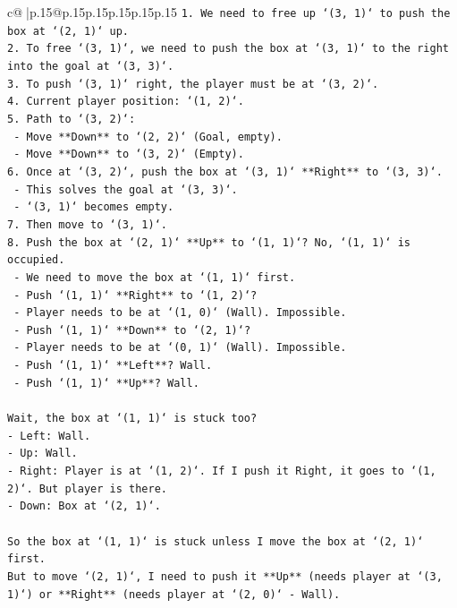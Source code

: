 \documentclass{article}
\begin{document}
{\begin{supertabular}{c@{$\;$}|p{.15\linewidth}@{}p{.15\linewidth}p{.15\linewidth}p{.15\linewidth}p{.15\linewidth}p{.15\linewidth}}
{{{\texttt{1. We need to free up `(3, 1)` to push the box at `(2, 1)` up.} \\
\texttt{2. To free `(3, 1)`, we need to push the box at `(3, 1)` to the right into the goal at `(3, 3)`.} \\
\texttt{3. To push `(3, 1)` right, the player must be at `(3, 2)`.} \\
\texttt{4. Current player position: `(1, 2)`.} \\
\texttt{5. Path to `(3, 2)`:} \\
\texttt{   {-} Move **Down** to `(2, 2)` (Goal, empty).} \\
\texttt{   {-} Move **Down** to `(3, 2)` (Empty).} \\
\texttt{6. Once at `(3, 2)`, push the box at `(3, 1)` **Right** to `(3, 3)`.} \\
\texttt{   {-} This solves the goal at `(3, 3)`.} \\
\texttt{   {-} `(3, 1)` becomes empty.} \\
\texttt{7. Then move to `(3, 1)`.} \\
\texttt{8. Push the box at `(2, 1)` **Up** to `(1, 1)`? No, `(1, 1)` is occupied.} \\
\texttt{   {-} We need to move the box at `(1, 1)` first.} \\
\texttt{   {-} Push `(1, 1)` **Right** to `(1, 2)`?} \\
\texttt{     {-} Player needs to be at `(1, 0)` (Wall). Impossible.} \\
\texttt{   {-} Push `(1, 1)` **Down** to `(2, 1)`?} \\
\texttt{     {-} Player needs to be at `(0, 1)` (Wall). Impossible.} \\
\texttt{   {-} Push `(1, 1)` **Left**? Wall.} \\
\texttt{   {-} Push `(1, 1)` **Up**? Wall.} \\
\\ 
\texttt{Wait, the box at `(1, 1)` is stuck too?} \\
\texttt{{-} Left: Wall.} \\
\texttt{{-} Up: Wall.} \\
\texttt{{-} Right: Player is at `(1, 2)`. If I push it Right, it goes to `(1, 2)`. But player is there.} \\
\texttt{{-} Down: Box at `(2, 1)`.} \\
\\ 
\texttt{So the box at `(1, 1)` is stuck unless I move the box at `(2, 1)` first.} \\
\texttt{But to move `(2, 1)`, I need to push it **Up** (needs player at `(3, 1)`) or **Right** (needs player at `(2, 0)` {-} Wall).} \\
}}}
\end{supertabular}}
\end{document}
